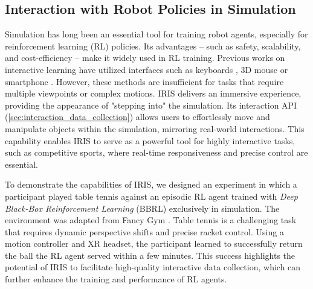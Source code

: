\subsection{Interaction with Robot Policies in Simulation}
Simulation has long been an essential tool for training robot agents, especially for reinforcement learning (RL) policies.
Its advantages -- such as safety, scalability, and cost-efficiency -- make it widely used in RL training. 
Previous works on interactive learning have utilized interfaces such as keyboards \cite{mandlekar2018roboturk}, 3D mouse \cite{luo2024precise, liu2024libero} or smartphone \cite{mandlekar2023human}. However, these methods are insufficient for tasks that require multiple viewpoints or complex motions.
IRIS delivers an immersive experience, providing the appearance of "stepping into" the simulation.
Its interaction API (\ref{sec:interaction_data_collection}) allows users to effortlessly move and manipulate objects within the simulation, mirroring real-world interactions.
This capability enables IRIS to serve as a powerful tool for highly interactive tasks, such as competitive sports, where real-time responsiveness and precise control are essential.



To demonstrate the capabilities of IRIS,
we designed an experiment in which a participant played table tennis against an episodic RL agent trained with \textit{Deep Black-Box Reinforcement Learning} (BBRL) \cite{otto2023deep} exclusively in simulation. 
The environment was adapted from Fancy Gym \cite{fancy_gym}.
Table tennis is a challenging task that requires dynamic perspective shifts and precise racket control.
Using a motion controller and XR headset, the participant learned to successfully return the ball the RL agent served within a few minutes.
This success highlights the potential of IRIS to facilitate high-quality interactive data collection, which can further enhance the training and performance of RL agents.

